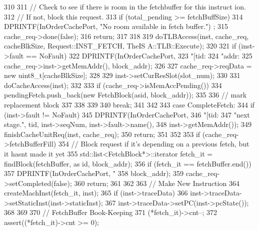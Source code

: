 \begin{DoxyCode}
{{{310 
311             // Check to see if there is room in the fetchbuffer for this instruct
      ion.
312             // If not, block this request.
313             if (total_pending >= fetchBuffSize) {
314                 DPRINTF(InOrderCachePort, "No room available in fetch buffer.\n")
      ;
315                 cache_req->done(false);
316                 return;
317             }
318 
319             doTLBAccess(inst, cache_req, cacheBlkSize, Request::INST_FETCH, TheIS
      A::TLB::Execute);
320 
321             if (inst->fault == NoFault) {
322                 DPRINTF(InOrderCachePort,
323                         "[tid:%
324                         "addr:%
325                         cache_req->inst->getMemAddr(), block_addr);
326 
327                 cache_req->reqData = new uint8_t[cacheBlkSize];
328 
329                 inst->setCurResSlot(slot_num);
330 
331                 doCacheAccess(inst);
332 
333                 if (cache_req->isMemAccPending()) {
334                     pendingFetch.push_back(new FetchBlock(asid, block_addr));
335 
336                     // mark replacement block
337                 }
338             }
339 
340             break;
341         }
342 
343       case CompleteFetch:
344         if (inst->fault != NoFault) {
345             DPRINTF(InOrderCachePort,
346                 "[tid:%
347                 "next stage.\n", tid, inst->seqNum, inst->fault->name(),
348                 inst->getMemAddr());
349             finishCacheUnitReq(inst, cache_req);
350             return;
351         }
352 
353         if (cache_req->fetchBufferFill) {
354             // Block request if it's depending on a previous fetch, but it hasnt 
      made it yet
355             std::list<FetchBlock*>::iterator fetch_it = findBlock(fetchBuffer, as
      id, block_addr);
356             if (fetch_it == fetchBuffer.end()) {
357                 DPRINTF(InOrderCachePort, "%
358                         block_addr);
359                 cache_req->setCompleted(false);
360                 return;
361             }
362 
363             // Make New Instruction
364             createMachInst(fetch_it, inst);
365             if (inst->traceData) {
366                 inst->traceData->setStaticInst(inst->staticInst);
367                 inst->traceData->setPC(inst->pcState());
368             }
369 
370             // FetchBuffer Book-Keeping
371             (*fetch_it)->cnt--;
372             assert((*fetch_it)->cnt >= 0);
}}}
\end{DoxyCode}
